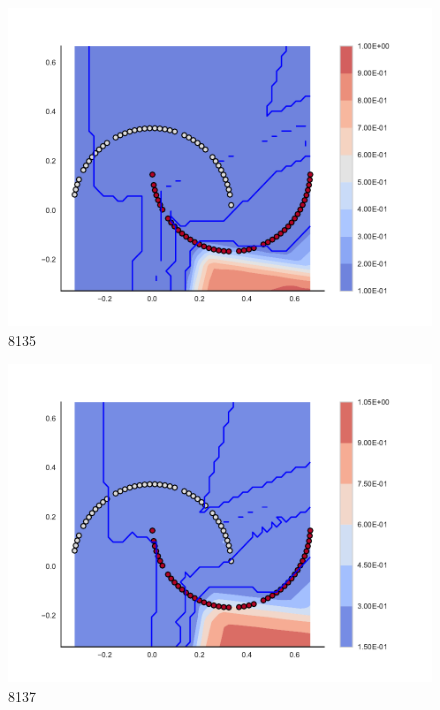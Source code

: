 \begin{subfigure}[b]{0.09\textwidth}
    \includegraphics[clip, trim=2.35cm 1.75cm 4.5cm 0cm,width=\textwidth]{img/convergence/8135.pdf}
    \caption{8135}
    \label{fig:convergence_8135}
\end{subfigure}
%
\begin{subfigure}[b]{0.09\textwidth}
    \includegraphics[clip, trim=2.35cm 1.75cm 4.5cm 0cm,width=\textwidth]{img/convergence/8137.pdf}
    \caption{8137}
    \label{fig:convergence_8137}
\end{subfigure}
%
